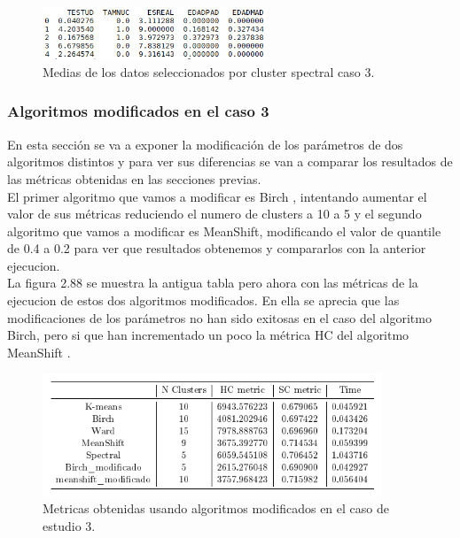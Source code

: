 	\begin{figure}[htb]
		\centering
		\includegraphics[width=0.6\textwidth]{./imagenes/caso3/medias_datos_caso3_spectral}
		\caption{Medias de los datos seleccionados por cluster spectral caso 3.} \label{fig:1}
	\end{figure}


	\subsubsection[Algoritmos modificados en el caso 3]{Algoritmos modificados en el caso 3}

	En esta sección se va a exponer la modificación de los parámetros de dos algoritmos distintos y para ver sus diferencias
	se van a comparar los resultados de las métricas obtenidas en las secciones previas. \\

	El primer algoritmo que vamos a modificar es Birch , intentando 
	aumentar el valor de sus métricas reduciendo el numero de clusters a 10 a 5 y el segundo algoritmo que vamos a modificar es MeanShift, 
	modificando el valor de quantile de 0.4 a 0.2
	para ver que resultados obtenemos y compararlos con la anterior ejecucion. \\

	La figura 2.88 se muestra la antigua tabla pero ahora con las métricas de la ejecucion de estos dos algoritmos modificados.
	En ella se aprecia que las modificaciones de los parámetros no han sido exitosas en el caso del algoritmo Birch, pero si que han incrementado
	un poco la métrica HC del algoritmo MeanShift .\\

	\begin{figure}[htb]
		\centering
		\includegraphics[width=0.9\textwidth]{./imagenes/caso3/algoritmos_modificados_caso3}
		\caption{Metricas obtenidas usando algoritmos modificados en el caso de estudio 3.} \label{fig:1}
	\end{figure}

